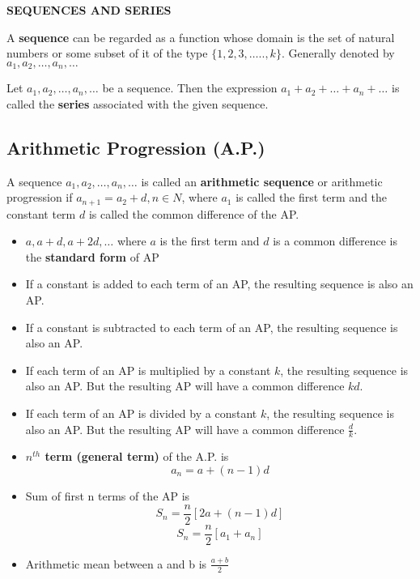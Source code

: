 \documentclass[12pt]{article}
\begin{document}
\begin{center}
    {\LARGE \textbf{SEQUENCES AND SERIES} }
\end{center}

\begin{multicols}{2}

    A \textbf{sequence} can be regarded as a function whose domain is the set of natural numbers or some subset of it of the type $\{1, 2, 3, ….., k\}$.
    Generally denoted by $a_1, a_2, \dots, a_n,\dots$

    Let $a_1, a_2, \dots, a_n,\dots$ be a sequence. Then the expression $a_1 + a_2 + \dots+ a_n + \dots$ is called the \textbf{series} associated with the given sequence.

    \subsection*{Arithmetic Progression (A.P.)}
    A sequence $a_1, a_2, \dots, a_n,\dots$ is called an \textbf{arithmetic sequence} or arithmetic progression if $a_{n+1} = a_2 + d, n \in N$, where $a_1$ is called the first term and the constant term $d$ is called the common difference of the AP.

    \begin{itemize}
        \item $a, a + d, a + 2d, \dots$ where $a$ is the first term and $d$ is a common difference is the \textbf{standard form} of AP
        \item If a constant is added to each term of an AP, the resulting sequence is also an AP.

        \item If a constant is subtracted to each term of an AP, the resulting sequence is also an AP.
        
        \item If each term of an AP is multiplied by a constant $k$, the resulting sequence is also an AP. But the resulting AP will have a common difference $kd$.
        
        \item If each term of an AP is divided by a constant $k$, the resulting sequence is also an AP. But the resulting AP will have a common difference $\frac{d}{k}$.
    
    
   \item  \textbf{$n^{th}$ term (general term)} of the A.P. is 
    $$a_n = a +(n-1) d$$
    \item Sum of first n terms of the AP is 
    $$S_n = \frac{n}{2}[2a+(n-1)d]$$
    $$S_n=\frac{n}{2}[a_1+a_n]$$
    \item Arithmetic mean between a and b is $\frac{a+b}{2}$
\end{itemize}


\end{multicols}
\end{document}

